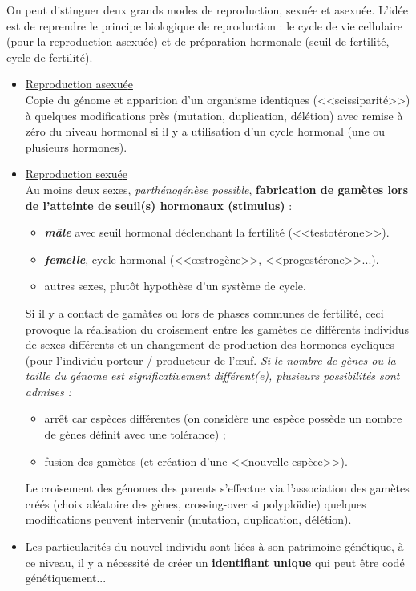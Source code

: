 \documentclass[11pt,twoside,a4paper]{article}
\begin{document}
On peut distinguer deux grands modes de reproduction, sexu{\'e}e et asexu{\'e}e. L'id{\'e}e est de reprendre le principe biologique de reproduction : le cycle de vie cellulaire (pour la reproduction asexu{\'e}e) et de pr{\'e}paration hormonale (seuil de fertilit{\'e}, cycle de fertilit{\'e}).
\begin{itemize}
	\item \underline{Reproduction asexu{\'e}e}~\\
		Copie du g{\'e}nome et apparition d'un organisme identiques (<<scissiparit{\'e}>>) {\`a} quelques modifications pr{\`e}s (mutation, duplication, d{\'e}l{\'e}tion) avec remise {\`a} z{\'e}ro du niveau hormonal si il y a utilisation d'un cycle hormonal (une ou plusieurs hormones). 
	\item \underline{Reproduction sexu{\'e}e}~\\
		Au moins deux sexes, \emph{parth{\'e}nog{\'e}n{\`e}se possible}, \textbf{fabrication de gam{\`e}tes lors de l'atteinte de seuil(s) hormonaux (stimulus)} : 
		\begin{itemize}
			\item \textbf{\textit{m{\^a}le}} avec seuil hormonal d{\'e}clenchant la fertilit{\'e} (<<testot{\'e}rone>>).
			\item \textbf{\textit{femelle}}, cycle hormonal (<<\oe strog{\`e}ne>>, <<progest{\'e}rone>>...). 
			\item autres sexes, plut{\^o}t hypoth{\`e}se d'un syst{\`e}me de cycle. 
		\end{itemize}
		Si il y a contact de gam{\`a}tes ou lors de phases communes de fertilit{\'e}, ceci provoque la r{\'e}alisation du croisement entre les gam{\`e}tes de diff{\'e}rents individus de sexes diff{\'e}rents et un changement de production des hormones cycliques (pour l'individu porteur / producteur de l'\oe uf. \emph{Si le nombre de g{\`e}nes ou la taille du g{\'e}nome est significativement diff{\'e}rent(e), plusieurs possibilit{\'e}s sont admises : }
		\begin{itemize}
			\item arr{\^e}t car esp{\`e}ces diff{\'e}rentes (on consid{\`e}re une esp{\`e}ce poss{\`e}de un nombre de g{\`e}nes d{\'e}finit avec une tol{\'e}rance) ; 
			\item fusion des gam{\`e}tes (et cr{\'e}ation d'une <<nouvelle esp{\`e}ce>>). 
		\end{itemize}
		Le croisement des g{\'e}nomes des parents s'effectue via l'association des gam{\`e}tes cr{\'e}{\'e}s (choix al{\'e}atoire des g{\`e}nes, crossing-over si polyplo{\"\i}die) quelques modifications peuvent intervenir (mutation, duplication, d{\'e}l{\'e}tion).
	\item Les particularit{\'e}s du nouvel individu sont li{\'e}es {\`a} son patrimoine g{\'e}n{\'e}tique, {\`a} ce niveau, il y a n{\'e}cessit{\'e} de cr{\'e}er un \textbf{identifiant unique} qui peut {\^e}tre cod{\'e} g{\'e}n{\'e}tiquement...
\end{itemize}~\\
\end{document}
